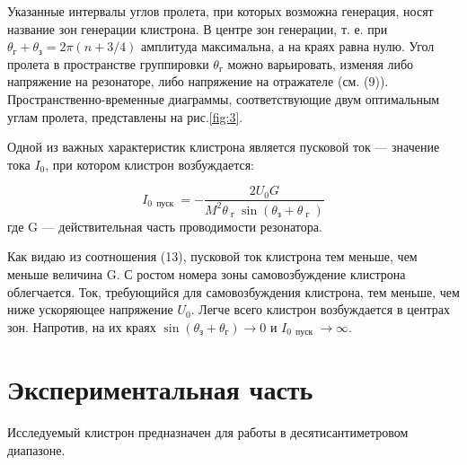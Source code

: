 Указанные интервалы углов пролета, при которых возможна генерация, носят название зон генерации клистрона. В центре зон генерации, т. е. при
$\theta _ { \text{г} } + \theta _ { \text{з} } = 2 \pi ( n + 3 / 4 )$ амплитуда максимальна, а на краях равна нулю. Угол пролета в пространстве группировки $\theta _ { \text{г} }$ можно варьировать, изменяя ли­бо напряжение на резонаторе, либо напряжение на отражателе (см. (9)).
Пространственно-временные диаграммы, соответствующие двум оптималь­ным углам пролета, представлены на рис.\ref{fig:3}.

Одной из важных характеристик клистрона является пусковой ток — значение тока $I_0$, при котором клистрон возбуждается:

\begin{equation}
	I _ { 0 \, \text { пуск } } = - \frac { 2 U _ { 0 } G } { M ^ { 2 } 
	\theta _ { \text{ г } } \sin \left( \theta _ { \text{з} } + \theta _ { \text{ г } } \right) }
\end{equation} где G — действительная часть проводимости резонатора.

Как видаю из соотношения (13), пусковой ток клистрона тем меньше, чем меньше величина G. С ростом номера зоны самовозбуждение клистрона облегчается. Ток, требующийся для самовозбуждения клистрона, тем меньше, чем ниже ускоряющее напряжение $U_0$. Легче всего клистрон возбуждается в центрах зон. Напротив, на их краях 
$\sin \left( \theta _ { \text{з} } + \theta _ { \text{г} } \right) \rightarrow 0$ и 
$I _ { 0\, \text { пуск } } \rightarrow \infty$.

\section{Экспериментальная часть}

Исследуемый клистрон предназначен для работы в десятисантиметровом диапазоне.


